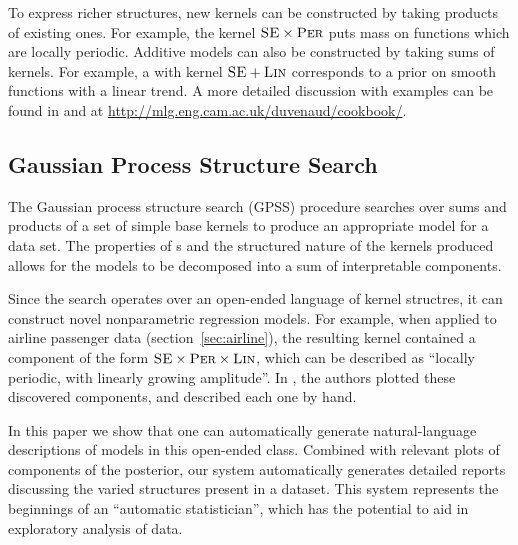 \documentclass{article}
\begin{document}
To express richer structures, new kernels can be constructed by taking products of existing ones.
For example, the kernel ${\textsc{SE}} \times {\textsc{Per}}$ puts mass on functions which are locally periodic.
Additive models can also be constructed by taking sums of kernels.
For example, a \gp{} with kernel ${\textsc{SE}} + {\textsc{Lin}}$ corresponds to a prior on smooth functions with a linear trend.
A more detailed discussion with examples can be found in \cite{DuvLloGroetal13} and at \url{http://mlg.eng.cam.ac.uk/duvenaud/cookbook/}.

\subsection{Gaussian Process Structure Search}

The Gaussian process structure search (GPSS) procedure \citep{DuvLloGroetal13} searches over sums and products of a set of simple base kernels to produce an appropriate model for a data set.
The properties of \gp{}s and the structured nature of the kernels produced allows for the models to be decomposed into a sum of interpretable components.

Since the search operates over an open-ended language of kernel structres, it can construct novel nonparametric regression models.
For example, when applied to airline passenger data (section~\ref{sec:airline}), the resulting kernel contained a component of the form ${\textsc{SE}} \times {\textsc{Per}} \times {\textsc{Lin}}$, which can be described as ``locally periodic, with linearly growing amplitude''.
In \citep{DuvLloGroetal13}, the authors plotted these discovered components, and described each one by hand.

In this paper we show that one can automatically generate natural-language descriptions of \gp{} models in this open-ended class.
Combined with relevant plots of components of the posterior, our system automatically generates detailed reports discussing the varied structures present in a dataset.
This system represents the beginnings of an ``automatic statistician'', which has the potential to aid in exploratory analysis of data.

%
\end{document}
